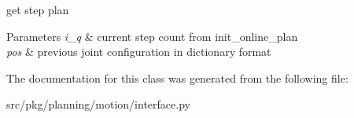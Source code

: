 get step plan 


\begin{DoxyParams}{Parameters}
{\em i\+\_\+q} & current step count from init\+\_\+online\+\_\+plan \\
\hline
{\em pos} & previous joint configuration in dictionary format \\
\hline
\end{DoxyParams}


The documentation for this class was generated from the following file\+:\begin{DoxyCompactItemize}
\item 
src/pkg/planning/motion/interface.\+py\end{DoxyCompactItemize}
